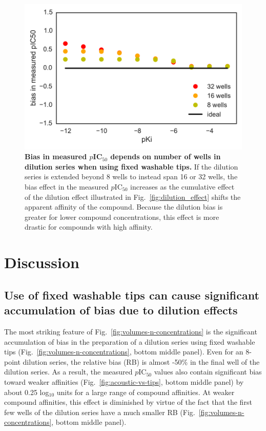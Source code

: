 \documentclass[aps,pre,twocolumn,nofootinbib,superscriptaddress,linenumbers]{revtex4-1}
\begin{document}
\begin{figure}[tb]
    \includegraphics[width=\columnwidth]{../figures/dilute-bias-pIC50-8-16-32.pdf}

  \caption{{\bf Bias in measured $p$IC$_{50}$ depends on number of wells in dilution series when using fixed washable tips.}
  If the dilution series is extended beyond 8 wells to instead span 16 or 32 wells, the bias effect in the measured $p$IC$_{50}$ increases as the cumulative effect of the dilution effect illustrated in Fig.~\ref{fig:dilution_effect} shifts the apparent affinity of the compound.
  Because the dilution bias is greater for lower compound concentrations, this effect is more drastic for compounds with high affinity.
  }
  \label{fig:bias_vs_nwells}
\end{figure}
\section{Discussion}

\subsection*{Use of fixed washable tips can cause significant accumulation of bias due to dilution effects}

The most striking feature of Fig.~\ref{fig:volumes-n-concentrations} is the significant accumulation of bias in the preparation of a dilution series using fixed washable tips (Fig.~\ref{fig:volumes-n-concentrations}, bottom middle panel).
Even for an 8-point dilution series, the relative bias (RB) is almost -50\% in the final well of the dilution series.
As a result, the measured $p$IC$_{50}$ values also contain significant bias toward weaker affinities (Fig.~\ref{fig:acoustic-vs-tips}, bottom middle panel) by about 0.25 log$_{10}$ units for a large range of compound affinities.
At weaker compound affinities, this effect is diminished by virtue of the fact that the first few wells of the dilution series have a much smaller RB (Fig.~\ref{fig:volumes-n-concentrations}, bottom middle panel).
\end{document}

